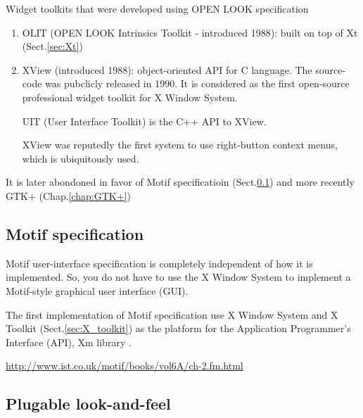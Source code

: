 Widget toolkits that were developed using OPEN LOOK specification
\begin{enumerate}
  \item OLIT (OPEN LOOK Intrinsics Toolkit - introduced 1988): built on top of Xt (Sect.\ref{sec:Xt})
  \label{sec:OLIT}
    
  \item XView (introduced 1988): object-oriented API for C language. The source-code was pubclicly released in 1990.
  It is considered as the first open-source professional widget toolkit for X Window System.
  \label{sec:XView}
  
  UIT (User Interface Toolkit) is the C++ API to XView.
  
  XView was reputedly the first system to use right-button context menus, which is ubiquitously used.
  
\end{enumerate}

It is later abondoned in favor of Motif specificatioin (Sect.\ref{sec:Motif_specification})
and more recently GTK+ (Chap.\ref{chap:GTK+})

\subsection{Motif specification}
\label{sec:Motif_specification}

Motif user-interface specification is completely independent of how it is
implemented. So, you do not have to use the X Window System to implement a
Motif-style graphical user interface (GUI).

The first implementation of Motif specification use X Window System and X
Toolkit (Sect.\ref{sec:X_toolkit}) as the platform for the Application
Programmer's Interface (API), Xm library .

\url{http://www.ist.co.uk/motif/books/vol6A/ch-2.fm.html}



\subsection{Plugable look-and-feel}
\label{sec:look_and_feel_plugable}

